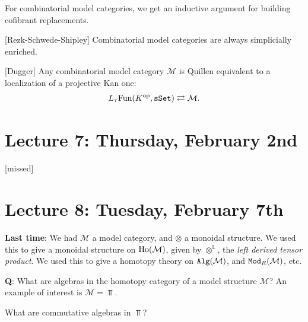 \documentclass[12pt]{amsart}
\theoremstyle{definition}
\begin{document}
For combinatorial model categories, we get an inductive argument for building cofibrant replacements.

[Rezk-Schwede-Shipley] Combinatorial model categories are always simplicially enriched.

[Dugger] Any combinatorial model category $\mathcal{M}$ is Quillen equivalent to a localization of a projective Kan one:
\begin{align*}
    L_\tau \text{Fun}(K^{\text{op}}, \texttt{sSet}) \rightleftarrows \mathcal{M}.
\end{align*}

\section{Lecture 7: Thursday, February 2nd}

[missed]

\section{Lecture 8: Tuesday, February 7th}

\textbf{Last time}: We had $\mathcal{M}$ a model category, and $\otimes$ a monoidal structure. We used this to give a monoidal structure on $\text{Ho}(\mathcal{M})$, given by $\otimes^{\mathbb{L}}$, the \textit{left derived tensor product}. We used this to give a homotopy theory on $\texttt{Alg}(\mathcal{M})$, and $\texttt{Mod}_R(\mathcal{M})$, etc.

\textbf{Q}: What are algebras in the homotopy category of a model structure $\mathcal{M}$? An example of interest is $\mathcal{M} = \Top$.

What are commutative algebras in $\Top$?
\end{document}
